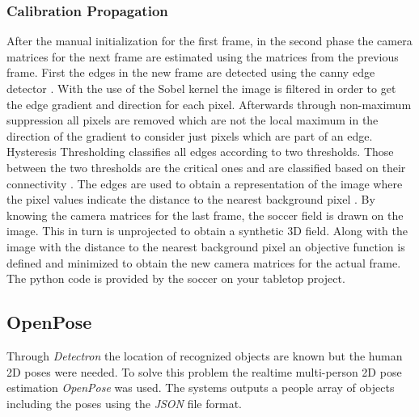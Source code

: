 \subsubsection{Calibration Propagation}
After the manual initialization for the first frame, in the second phase the camera matrices for the next frame are estimated using the matrices from the previous frame. First the edges in the new frame are detected using the canny edge detector \cite{canny}. With the use of the Sobel kernel the image is filtered in order to get the edge gradient and direction for each pixel. Afterwards through non-maximum suppression all pixels are removed which are not the local maximum in the direction of the gradient to consider just pixels which are part of an edge. Hysteresis Thresholding classifies all edges according to two thresholds. Those between the two thresholds are the critical ones and are classified based on their connectivity \cite{canny}. The edges are used to obtain a representation of the image where the pixel values indicate the distance to the nearest background pixel \cite{distance_transform}. By knowing the camera matrices for the last frame, the soccer field is drawn on the image. This in turn is unprojected to obtain a synthetic 3D field. Along with the image with the distance to the nearest background pixel an objective function is defined and minimized to obtain the new camera matrices for the actual frame. The python code is provided by the soccer on your tabletop \cite{tabletop} project.

\subsection{OpenPose}\label{sec:openpose}
Through \textit{Detectron} the location of recognized objects are known but the human 2D poses were needed. To solve this problem the realtime multi-person 2D pose estimation \textit{OpenPose}\cite{openpose_paper} was used. The systems outputs a people array of objects including the poses using the \textit{JSON} file format.

